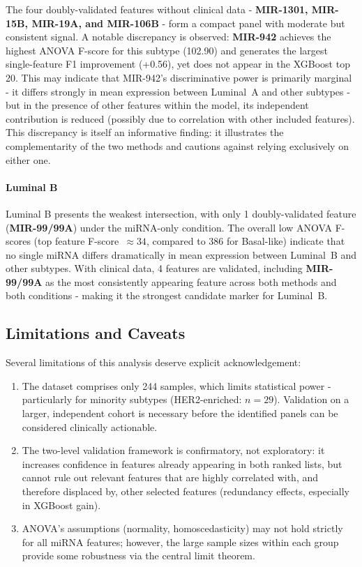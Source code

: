 The four doubly-validated features without clinical data - \textbf{MIR-1301, MIR-15B,
MIR-19A, and MIR-106B} - form a compact panel with moderate but consistent signal.
A notable discrepancy is observed: \textbf{MIR-942} achieves the highest ANOVA F-score
for this subtype (102.90) and generates the largest single-feature F1 improvement (+0.56),
yet does not appear in the XGBoost top 20. This may indicate that MIR-942's discriminative
power is primarily marginal - it differs strongly in mean expression between Luminal~A and
other subtypes - but in the presence of other features within the model, its independent
contribution is reduced (possibly due to correlation with other included features). This
discrepancy is itself an informative finding: it illustrates the complementarity of the two
methods and cautions against relying exclusively on either one.

\paragraph{Luminal B}

Luminal B presents the weakest intersection, with only 1 doubly-validated feature
(\textbf{MIR-99/99A}) under the miRNA-only condition. The overall low ANOVA
F-scores (top feature F-score~$\approx 34$, compared to 386 for Basal-like) indicate that
no single miRNA differs dramatically in mean expression between Luminal~B and other subtypes.
With clinical data, 4 features are validated, including \textbf{MIR-99/99A} as the most
consistently appearing feature across both methods and both conditions - making it the
strongest candidate marker for Luminal~B.

\subsection{Limitations and Caveats}

Several limitations of this analysis deserve explicit acknowledgement:

\begin{enumerate}
    \item The dataset comprises only 244 samples, which limits statistical power -
    particularly for minority subtypes (HER2-enriched: $n=29$). Validation on a larger,
    independent cohort is necessary before the identified panels can be considered clinically
    actionable.

    \item The two-level validation framework is confirmatory, not exploratory: it increases
    confidence in features already appearing in both ranked lists, but cannot rule out relevant
    features that are highly correlated with, and therefore displaced by, other selected features
    (redundancy effects, especially in XGBoost gain).

    \item ANOVA's assumptions (normality, homoscedasticity) may not hold strictly for all
    miRNA features; however, the large sample sizes within each group provide some robustness
    via the central limit theorem.
\end{enumerate}

